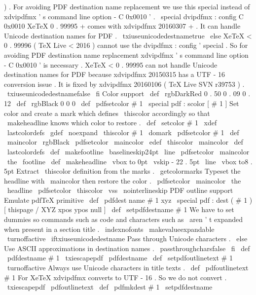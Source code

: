 {{)
.
%
For
avoiding
PDF
destination
name
replacement
we
use
this
special
%
instead
of
xdvipdfmx
'
s
command
line
option
-
C
0x0010
'
.
\
special
{
dvipdfmx
:
config
C
0x0010
}
%
XeTeX
0
.
99995
+
comes
with
xdvipdfmx
20160307
+
.
%
It
can
handle
Unicode
destination
names
for
PDF
.
\
txiuseunicodedestnametrue
\
else
%
XeTeX
<
0
.
99996
(
TeX
Live
<
2016
)
cannot
use
the
%
dvipdfmx
:
config
'
special
.
%
So
for
avoiding
PDF
destination
name
replacement
%
xdvipdfmx
'
s
command
line
option
-
C
0x0010
'
is
necessary
.
%
%
XeTeX
<
0
.
99995
can
not
handle
Unicode
destination
names
for
PDF
%
because
xdvipdfmx
20150315
has
a
UTF
-
16
conversion
issue
.
%
It
is
fixed
by
xdvipdfmx
20160106
(
TeX
Live
SVN
r39753
)
.
\
txiuseunicodedestnamefalse
\
fi
%
%
Color
support
%
\
def
\
rgbDarkRed
{
0
.
50
0
.
09
0
.
12
}
\
def
\
rgbBlack
{
0
0
0
}
%
\
def
\
pdfsetcolor
#
1
{
\
special
{
pdf
:
scolor
[
#
1
]
}
}
%
%
Set
color
and
create
a
mark
which
defines
\
thiscolor
accordingly
%
so
that
\
makeheadline
knows
which
color
to
restore
.
\
def
\
setcolor
#
1
{
%
\
xdef
\
lastcolordefs
{
\
gdef
\
noexpand
\
thiscolor
{
#
1
}
}
%
\
domark
\
pdfsetcolor
{
#
1
}
%
}
%
\
def
\
maincolor
{
\
rgbBlack
}
\
pdfsetcolor
{
\
maincolor
}
\
edef
\
thiscolor
{
\
maincolor
}
\
def
\
lastcolordefs
{
}
%
\
def
\
makefootline
{
%
\
baselineskip24pt
\
line
{
\
pdfsetcolor
{
\
maincolor
}
\
the
\
footline
}
%
}
%
\
def
\
makeheadline
{
%
\
vbox
to
0pt
{
%
\
vskip
-
22
.
5pt
\
line
{
%
\
vbox
to8
.
5pt
{
}
%
%
Extract
\
thiscolor
definition
from
the
marks
.
\
getcolormarks
%
Typeset
the
headline
with
\
maincolor
then
restore
the
color
.
\
pdfsetcolor
{
\
maincolor
}
\
the
\
headline
\
pdfsetcolor
{
\
thiscolor
}
%
}
%
\
vss
}
%
\
nointerlineskip
}
%
%
PDF
outline
support
%
%
Emulate
pdfTeX
primitive
\
def
\
pdfdest
name
#
1
xyz
{
%
\
special
{
pdf
:
dest
(
#
1
)
[
thispage
/
XYZ
xpos
ypos
null
]
}
%
}
%
\
def
\
setpdfdestname
#
1
{
{
%
%
We
have
to
set
dummies
so
commands
such
as
code
and
characters
%
such
as
\
aren
'
t
expanded
when
present
in
a
section
title
.
\
indexnofonts
\
makevalueexpandable
\
turnoffactive
\
iftxiuseunicodedestname
%
Pass
through
Unicode
characters
.
\
else
%
Use
ASCII
approximations
in
destination
names
.
\
passthroughcharsfalse
\
fi
\
def
\
pdfdestname
{
#
1
}
%
\
txiescapepdf
\
pdfdestname
}
}
%
\
def
\
setpdfoutlinetext
#
1
{
{
%
\
turnoffactive
%
Always
use
Unicode
characters
in
title
texts
.
\
def
\
pdfoutlinetext
{
#
1
}
%
%
For
XeTeX
xdvipdfmx
converts
to
UTF
-
16
.
%
So
we
do
not
convert
.
\
txiescapepdf
\
pdfoutlinetext
}
}
%
\
def
\
pdfmkdest
#
1
{
%
\
setpdfdestname
}}}
